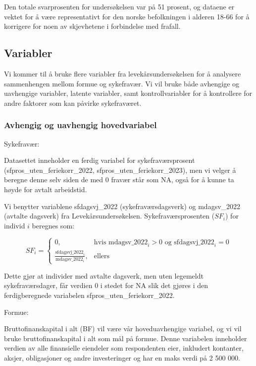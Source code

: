 \documentclass[
  12pt,
  a4paper,
  DIV=11,
  numbers=noendperiod]{scrartcl}
\begin{document}
Den totale svarprosenten for undersøkelsen var på 51 prosent, og dataene
er vektet for å være representativt for den norske befolkningen i
alderen 18-66 for å korrigere for noen av skjevhetene i forbindelse med
frafall.

\subsection{Variabler}\label{variabler}

Vi kommer til å bruke flere variabler fra levekårsundersøkelsen for å
analysere sammenhengen mellom formue og sykefravær. Vi vil bruke både
avhengige og uavhengige variabler, latente variabler, samt
kontrollvariabler for å kontrollere for andre faktorer som kan påvirke
sykefraværet.

\subsubsection{Avhengig og uavhengig
hovedvariabel}\label{avhengig-og-uavhengig-hovedvariabel}

Sykefravær:

Datasettet inneholder en ferdig variabel for sykefraværsprosent
(sfpros\_uten\_feriekorr\_2022, sfpros\_uten\_feriekorr\_2023), men vi
velger å beregne denne selv siden de med 0 fravær står som NA, også for
å kunne ta høyde for avtalt arbeidstid.

Vi benytter variablene sfdagsvj\_2022 (sykefraværsdagsverk) og
mdagsv\_2022 (avtalte dagsverk) fra Levekårsundersøkelsen.
Sykefraværsprosenten (\(SF_i\)) for individ \(i\) beregnes som:

\[
SF_i = 
\begin{cases}
0, & \text{hvis } \mathrm{mdagsv\_2022}_i > 0 \text{ og } \mathrm{sfdagsvj\_2022}_i = 0 \\
\frac{ \mathrm{sfdagsvj\_2022}_i }{ \mathrm{mdagsv\_2022}_i }, & \text{ellers}
\end{cases}
\]

Dette gjør at individer med avtalte dagsverk, men uten legemeldt
sykefraværsdager, får verdien 0 i stedet for NA slik det gjøres i den
ferdigberegnede variabelen sfpros\_uten\_feriekorr\_2022.

Formue:

Bruttofinanskapital i alt (BF) vil være vår hoveduavhengige variabel, og
vi vil bruke bruttofinanskapital i alt som mål på formue. Denne
variabelen inneholder verdien av alle finansielle eiendeler som
respondenten eier, inkludert kontanter, aksjer, obligasjoner og andre
investeringer og har en maks verdi på 2 500 000.
\end{document}
